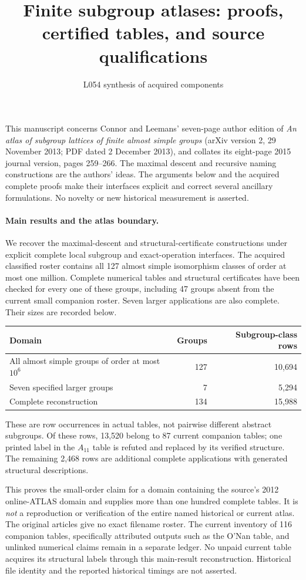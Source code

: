 \documentclass[11pt]{article}
\title{Finite subgroup atlases: proofs, certified tables, and source qualifications}
\author{L054 synthesis of acquired components}\date{}
\begin{document}
\maketitle
This manuscript concerns Connor and Leemans' seven-page author edition
of \emph{An atlas of subgroup lattices of finite almost simple groups}
(arXiv version 2, 29 November 2013; PDF dated 2 December 2013), and
collates its eight-page 2015 journal version, pages 259--266.
The maximal descent and recursive naming constructions are the authors'
ideas. The arguments below and the acquired complete proofs make their
interfaces explicit and correct several ancillary formulations.
No novelty or new historical measurement is asserted.

\paragraph{Main results and the atlas boundary.}
We recover the maximal-descent and structural-certificate constructions under
explicit complete local subgroup and exact-operation interfaces. The acquired
classified roster contains all 127 almost simple isomorphism classes of order
at most one million. Complete numerical tables and structural certificates
have been checked for every one of these groups, including 47 groups absent
from the current small companion roster. Seven larger applications are also
complete. Their sizes are recorded below.
\begin{center}
\begin{tabular}{lrr}\toprule
Domain & Groups & Subgroup-class rows\\\midrule
All almost simple groups of order at most $10^6$ & 127 & 10,694\\
Seven specified larger groups & 7 & 5,294\\\midrule
Complete reconstruction & 134 & 15,988\\\bottomrule
\end{tabular}
\end{center}
These are row occurrences in actual tables, not pairwise different abstract
subgroups. Of these rows, 13,520 belong to 87 current companion tables;
one printed label in the $A_{11}$ table is refuted and replaced by its
verified structure. The remaining 2,468 rows are additional complete
applications with generated structural descriptions.

This proves the small-order claim for a domain containing the source's
2012 online-ATLAS domain and supplies more than one hundred complete tables.
It is \emph{not} a reproduction or verification of the entire named historical
or current atlas. The original articles give no exact filename roster.
The current inventory of 116 companion tables, specifically attributed
outputs such as the O'Nan table, and unlinked numerical claims remain in a
separate ledger. No unpaid current table acquires its structural labels
through this main-result reconstruction. Historical file identity and the
reported historical timings are not asserted.
\end{document}
